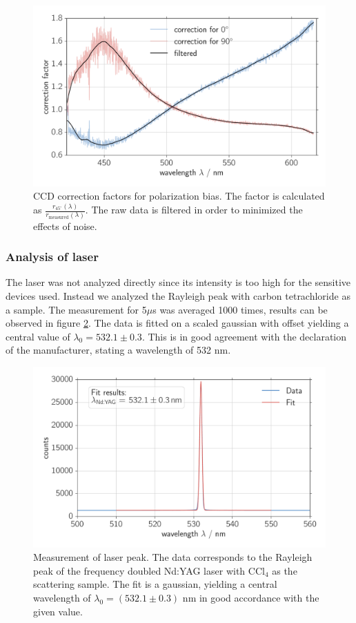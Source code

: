 \begin{figure}[htpb]
    \centering
    \includegraphics[width=0.8\linewidth]{analysis/figures/ccd_correction}
    \caption{CCD correction factors for polarization bias. The factor is calculated as 
        $\frac{r_{45^\circ}(\lambda)}{r_\text{measured}(\lambda)}$. The raw data is filtered in order to minimized 
    the effects of noise.}
    \label{fig:ccd_correction}
\end{figure}

\subsubsection{Analysis of laser}
The laser was not analyzed directly since its intensity is too high for the sensitive devices used. Instead we 
analyzed the Rayleigh peak with carbon tetrachloride as a sample. The measurement for 5$\mu$s was averaged 1000
times, results can be observed in figure \ref{fig:ccd_laser_peak}. The data is fitted on a scaled gaussian with 
offset yielding a central value of $\lambda_0 = 532.1 \pm 0.3$. This is in good agreement with the declaration 
of the manufacturer, stating a wavelength of 532 nm. 


\begin{figure}[htpb]
    \centering
    \includegraphics[width=0.8\linewidth]{analysis/figures/ccd_laser_peak}
    \caption{Measurement of laser peak. The data corresponds to the Rayleigh peak of the frequency doubled Nd:YAG 
    laser with CCl$_4$ as the scattering sample. The fit is a gaussian, yielding a central wavelength of 
$\lambda_0 = (532.1 \pm 0.3)$ nm in good accordance with the given value. }
    \label{fig:ccd_laser_peak}
\end{figure}


